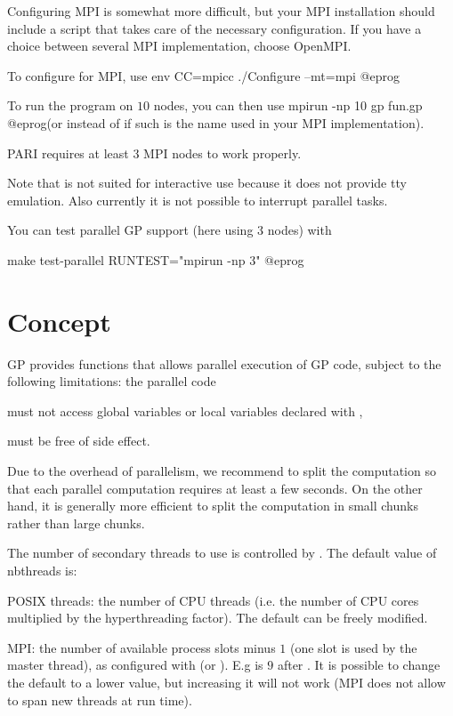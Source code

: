 Configuring MPI is somewhat more difficult, but your MPI installation should
include a script  that takes care of the necessary configuration.
If you have a choice between several MPI implementation, choose OpenMPI.

To configure for MPI, use
\bprog
env CC=mpicc ./Configure --mt=mpi
@eprog

To run the program  on $10$ nodes, you can then use
\bprog
  mpirun -np 10 gp fun.gp
@eprog\noindent (or  instead of  if such is
the name used in your MPI implementation).

PARI requires at least $3$ MPI nodes to work properly.

Note that  is not suited for interactive use because it
does not provide tty emulation. Also currently it is not possible to
interrupt parallel tasks.

You can test parallel GP support (here using 3 nodes) with

\bprog
make test-parallel RUNTEST="mpirun -np 3"
@eprog

\section{Concept}

GP provides functions that allows parallel execution of GP code, subject to
the following limitations: the parallel code

\item must not access global variables or local variables declared with
  ,

\item must be free of side effect.

Due to the overhead of parallelism, we recommend to split the computation so
that each parallel computation requires at least a few seconds. On the other
hand, it is generally more efficient to split the computation in small chunks
rather than large chunks.


The number of secondary threads to use is controlled by
. The default value of nbthreads is:

\item POSIX threads: the number of CPU threads (i.e. the number of CPU cores
multiplied by the hyperthreading factor).
The default can be freely modified.

\item MPI: the number of available process slots minus $1$ (one slot is used by
the master thread), as configured with  (or ). E.g
 is $9$ after .
It is possible to change the default to a lower value, but increasing it will
not work (MPI does not allow to span new threads at run time).

